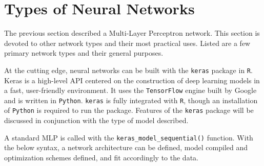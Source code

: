 
\section{Types of Neural Networks} %

The previous section described a Multi-Layer Perceptron network. This
section is devoted to other network types and their most practical uses. Listed are a few primary network types and their general purposes.

At the cutting edge, neural networks can be built with the
\texttt{keras} package in \texttt{R}. Keras is a high-level API centered
on the construction of deep learning models in a fast, user-friendly
environment. It uses the \texttt{TensorFlow} engine built by Google and
is written in \texttt{Python}. \texttt{keras} is fully integrated with
\texttt{R}, though an installation of \texttt{Python} is required to run
the package. Features of the \texttt{keras} package will be discussed in
conjunction with the type of model described.

A standard MLP is called with the \texttt{keras\_model\_sequential()}
function. With the below syntax, a network architecture can be defined,
model compiled and optimization schemes defined, and fit accordingly to
the data.

\begin{Shaded}
\begin{Highlighting}[]
\OtherTok{\textless{}{-}} \NormalTok{()           }
\SpecialCharTok{\%\textgreater{}\%}
      \NormalTok{(} \NormalTok{, } \NormalTok{, } \NormalTok{(}\NormalTok{)) }\SpecialCharTok{\%\textgreater{}\%}
      \NormalTok{(} \NormalTok{, } \NormalTok{) }\SpecialCharTok{\%\textgreater{}\%} 
          \NormalTok{(} \NormalTok{,      }
           \NormalTok{,}
           \NormalTok{) }\SpecialCharTok{\%\textgreater{}\%} 
               \NormalTok{,}
               \NormalTok{,}
               \NormalTok{)}
\end{Highlighting}
\end{Shaded}

